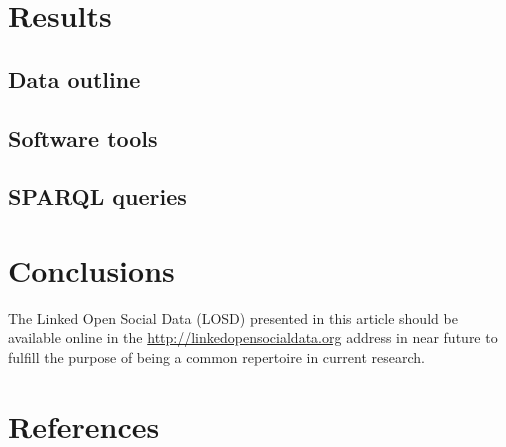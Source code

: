\documentclass[review]{elsarticle}
\begin{document}
\section{Results}
\label{outline}
\subsection{Data outline}

\subsection{Software tools}
\subsection{SPARQL queries}\label{queries}

\section{Conclusions}
\label{conclusions}
The Linked Open Social Data (LOSD) presented in this article
should be available online in the \url{http://linkedopensocialdata.org}
address in near future to fulfill the purpose of being a common
repertoire in current research.

\section*{References}
%

%
%
\end{document}
